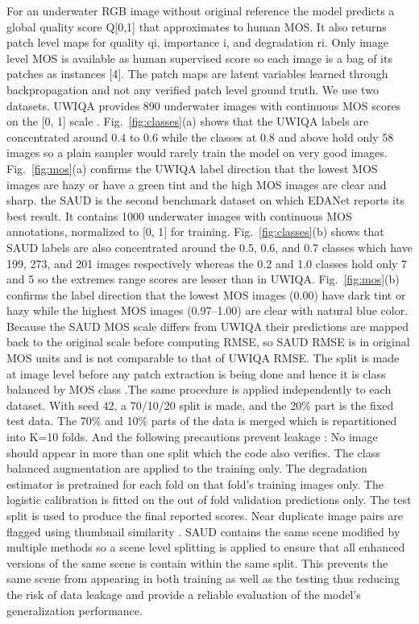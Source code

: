 \documentclass[conference]{IEEEtran}
\begin{document}
For an underwater RGB image without original reference the model predicts a global quality score Q[0,1] that approximates to human MOS. It also returns patch level maps for quality qi, importance i, and degradation ri. Only image level MOS is available as human supervised score so each image is a bag of its patches as instances [4]. The patch maps are latent variables learned through backpropagation and not any verified patch level ground truth.
We use two datasets. UWIQA provides 890 underwater images with continuous MOS scores on the [0, 1] scale . Fig.~\ref{fig:classes}(a) shows that the UWIQA labels are concentrated around 0.4 to 0.6 while the classes at 0.8 and above hold only 58 images so a plain sampler would rarely train the model on very good images. Fig.~\ref{fig:mos}(a) confirms the UWIQA label direction that the lowest MOS images are hazy or have a green tint and the high MOS images are clear and sharp. the SAUD is the second benchmark dataset on which EDANet reports its best result. It contains 1000 underwater images with continuous MOS annotations, normalized to [0, 1] for training. Fig.~\ref{fig:classes}(b) shows that SAUD labels are also concentrated around the 0.5, 0.6, and 0.7 classes which have 199, 273, and 201 images respectively  whereas the 0.2 and 1.0 classes hold only 7 and 5 so the extremes range scores are lesser than in UWIQA. Fig.~\ref{fig:mos}(b) confirms the label direction that the lowest MOS images (0.00) have dark tint or hazy while the highest MOS images (0.97–1.00) are clear with natural blue color. Because the SAUD MOS scale differs from UWIQA their predictions are mapped back to the original scale before computing RMSE, so SAUD RMSE is in original MOS units and is not comparable to that of UWIQA RMSE.
The split is made at image level before any patch extraction is being done and hence it is class balanced by MOS class .The same procedure is applied independently to each dataset. With seed 42, a 70/10/20 split is made, and the 20\% part is the fixed test data. The 70\% and 10\% parts of the data is merged  which is repartitioned into K=10 folds. And the following precautions prevent leakage :
No image should appear in more than one split which the code also verifies.
The class balanced  augmentation are applied to the training only.
The degradation estimator is pretrained for each fold on that fold’s training images only.
The logistic calibration is fitted on the out of fold  validation predictions only.
The test split is used to produce the final reported scores.
Near duplicate image pairs are flagged using thumbnail similarity .
SAUD contains the same scene modified by multiple methods so a scene level splitting is applied to ensure that all enhanced versions of the same scene is contain within the same split. This prevents the same scene from appearing in both training as well as the testing thus reducing the risk of data leakage and provide a reliable evaluation of the model's generalization performance.
\end{document}
